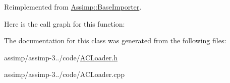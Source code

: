 Reimplemented from \hyperlink{class_assimp_1_1_base_importer_a2ecaa6b808b2b282cb6aa321970a2ad3}{Assimp\+::\+Base\+Importer}.



Here is the call graph for this function\+:




The documentation for this class was generated from the following files\+:\begin{DoxyCompactItemize}
\item 
assimp/assimp-\/3../code/\hyperlink{_a_c_loader_8h}{A\+C\+Loader.\+h}\item 
assimp/assimp-\/3../code/A\+C\+Loader.\+cpp\end{DoxyCompactItemize}
